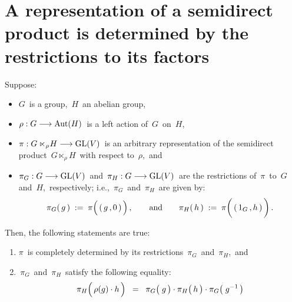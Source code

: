 
\vskip 0.5cm
\section{A representation of a semidirect product is determined by the restrictions to its factors}

\begin{proposition}
\mbox{}
\vskip 0.1cm
\noindent
Suppose:
\begin{itemize}
\item
	$G$\, is a group, \,$H$\, an {\color{red}abelian} group,
\item
	$\rho : G \longrightarrow \textnormal{Aut}(H)$\,
	is a left action of \,$G$\, on \,$H$,\,
\item
	$\pi : G \ltimes_{\rho}\! H \longrightarrow \textnormal{GL}(V)$\,
	is an arbitrary representation of the semidirect product
	\,$G \ltimes_{\rho}\! H$\, with respect to \,$\rho$,\, and
\item
	$\pi_{G} : G \longrightarrow \textnormal{GL}(V)$\, and \,$\pi_{H} : G \longrightarrow \textnormal{GL}(V)$\,
	are the restrictions of \,$\pi$\, to \,$G$\, and \,$H$,\, respectively; i.e.,
	\,$\pi_{G}$\, and \,$\pi_{H}$\,
	are given by:
	\begin{equation*}
	\pi_{G}(\,g\,) \; := \; \pi\!\left(\,(\,\overset{{\color{white}1}}{g}\,,0\,)\,\right),
	\quad\quad
	\textnormal{and}
	\quad\quad
	\pi_{H}(\,h\,) \; := \; \pi\!\left(\,(\,1_{G}\,,\overset{{\color{white}1}}{h}\,)\,\right).
	\end{equation*}
\end{itemize}
Then, the following statements are true:
\begin{enumerate}
\item
	$\pi$\, is completely determined by its restrictions \,$\pi_{G}$\, and \,$\pi_{H}$,\, and
\item
	\,$\pi_{G}$\, and \,$\pi_{H}$\, satisfy the following equality:
	\begin{equation*}
	\pi_{H}\!\left(\,\rho(g) \cdot \overset{{\color{white}.}}{h}\,\right)
	\;\; = \;\;
		\pi_{G}\!\left(\; \overset{{\color{white}.}}{g} \,\right)
		\cdot
		\pi_{H}\!\left(\overset{{\color{white}.}}{{\color{white}g}}\!\! h \,\right)
		\cdot
		\pi_{G}\!\left(\; g^{-1} \,\right)
	\end{equation*}
\end{enumerate}
\end{proposition}
\proof
